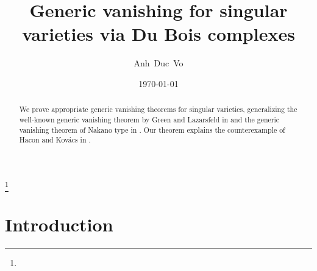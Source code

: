 \documentclass[11pt]{amsart}
\theoremstyle{definition}
\theoremstyle{plain}
\newcommand{\Kovacs}{Kov\'acs}
\begin{document}
\title{Generic vanishing for singular varieties via Du Bois complexes}
\author[A. D.~Vo]{Anh~Duc~Vo}
\address{Department of Mathematics, Harvard University, 
1 Oxford Street, Cambridge, MA 02138, USA} 

\thanks{}
\date{\today}

\subjclass[2020]{}

\begin{abstract}
We prove appropriate generic vanishing theorems for singular varieties, generalizing the well-known generic vanishing theorem by Green and Lazarsfeld in \cite{GL87} and the generic vanishing theorem of Nakano type in \cite{PS_generic_vanishing}. Our theorem explains the counterexample of Hacon and \Kovacs{} in \cite{Hacon-counter_eg_for_GV}. 
\end{abstract}



\maketitle

\makeatletter
\newcommand\@dotsep{4.5}
\def\@tocline#1#2#3#4#5#6#7{\relax
  \ifnum #1>\c@tocdepth %
  \else
    \par \addpenalty\@secpenalty\addvspace{#2}%
    \begingroup \hyphenpenalty\@M
    \@ifempty{#4}{%
      \@tempdima\csname r@tocindent\number#1\endcsname\relax
    }{%
      \@tempdima#4\relax
    }%
    \parindent\z@ \leftskip#3\relax
    \advance\leftskip\@tempdima\relax
    \rightskip\@pnumwidth plus1em \parfillskip-\@pnumwidth
    #5\leavevmode\hskip-\@tempdima #6\relax
    \leaders\hbox{$\m@th
      \mkern \@dotsep mu\hbox{.}\mkern \@dotsep mu$}\hfill
    \hbox to\@pnumwidth{\@tocpagenum{#7}}\par
    \nobreak
    \endgroup
  \fi}
\def\l@section{\@tocline{1}{0pt}{1pc}{}{\bfseries}}
\def\l@subsection{\@tocline{2}{0pt}{25pt}{5pc}{}}
\makeatother






\tableofcontents

\section{Introduction}
\end{document}
